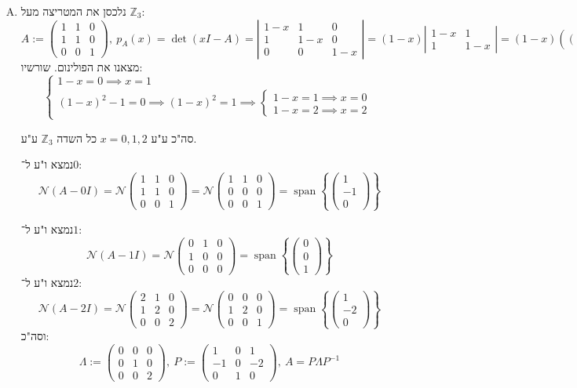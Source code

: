 \documentclass[]{article}
\newcommand\Z     {\mathbb{Z}}
\newcommand\nc    {\mathcal{N}}
\DeclareMathOperator{\Sp}     {span}
\newcommand\pms[1]    {\begin{pmatrix}
		#1
\end{pmatrix}}
\newcommand\detms[1]  {\left\vert\begin{matrix}
		#1
\end{matrix}\right\vert}
\newcommand\Lg        {\Lambda}
\newcommand\op    {^{-1}}
\newcommand\ccb[1]    {\left \{ #1 \right \}}
\theoremstyle{definition}
\begin{document}
\begin{enumerate}[A)]
		
		\item נלכסן את המטריצה מעל $\Z_3$: 
		\[ A := \pms{1 & 1 & 0 \\ 1 & 1 & 0 \\ 0 & 0 & 1}, \ p_A(x) = \det(xI - A) = \detms{1 - x & 1 & 0 \\ 1 & 1 - x & 0 \\ 0 & 0 & 1 - x} = (1 - x)\detms{1 - x & 1 \\ 1 & 1 - x} = (1 - x)((1 - x)^{2} - 1) \]
		מצאנו את הפולינום. שורשיו: 
		\[ \begin{cases}
			1 - x = 0 \implies x = 1 \\
			(1 - x)^2 -1 = 0 \implies (1 - x)^2 = 1 \implies \begin{cases}
				1 - x = 1 \implies x = 0 \\
				1 - x = 2 \implies x = 2
			\end{cases}
		\end{cases} \]
		
		סה"כ ע"ע $x = 0, 1, 2$ כל השדה $\Z_3$ ע"ע. 
		
		נמצא ו"ע ל־$0$: 
		\[ \nc(A - 0I) = \nc\pms{1 & 1 & 0 \\ 1 & 1 & 0 \\ 0 & 0 & 1} = \nc\pms{1 & 1 & 0 \\ 0 & 0 & 0 \\ 0& 0 & 1} = \Sp\ccb{\pms{1 \\ -1 \\ 0}} \]
		
		נמצא ו"ע ל־$1$: 
		\[ \nc(A - 1I) = \nc\pms{0 & 1 & 0 \\ 1 & 0 & 0 \\ 0& 0 & 0} = \Sp\ccb{\pms{0 \\ 0 \\ 1}} \]
		נמצא ו"ע ל־$2$: 
		\[ \nc(A - 2I) = \nc\pms{2 & 1 & 0 \\ 1 & 2 & 0 \\ 0 & 0 & 2} = \nc\pms{0 & 0 & 0 \\ 1 & 2 & 0 \\ 0 & 0 & 1} = \Sp\ccb{\pms{1 \\ -2 \\ 0}} \]
		וסה"כ: 
		\[ \Lg := \pms{0 & 0 & 0 \\ 0 & 1 & 0 \\ 0 & 0 & 2}, \ P := \pms{1 & 0 & 1 \\ -1 & 0 & -2 \\ 0 & 1 & 0}, \ A = P\Lg P\op \]
	\end{enumerate}
	
\end{document}
